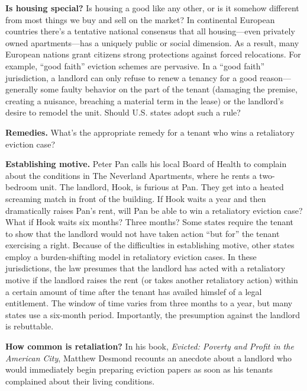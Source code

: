 \item \textbf{Is housing special?} Is housing a good like any other, or is it
somehow different from most things we buy and sell on the market? In
continental European countries there's a tentative national consensus that all
housing---even privately owned apartments---has a uniquely public or social
dimension.  As a result, many European nations grant citizens strong
protections against forced relocations.  For example, ``good faith'' eviction
schemes are pervasive.  In a ``good faith'' jurisdiction, a landlord can only
refuse to renew a tenancy for a good reason---generally some faulty behavior on
the part of the tenant (damaging the premise, creating a nuisance, breaching a
material term in the lease) or the landlord's desire to remodel the unit. 
Should U.S. states adopt such a rule?


\item \textbf{Remedies.} What's the appropriate remedy for a tenant who wins a
retaliatory eviction case?


\item \textbf{Establishing motive.} Peter Pan calls his local Board of Health to
complain about the conditions in The Neverland Apartments, where he rents a
two-bedroom unit. The landlord, Hook, is furious at Pan.  They get into a
heated screaming match in front of the building.  If Hook waits a year and then
dramatically raises Pan's rent, will Pan be able to win a retaliatory eviction
case?  What if Hook waits six months? Three months? Some states require the
tenant to show that the landlord would not have taken action ``but for'' the
tenant exercising a right.  Because of the difficulties in establishing motive,
other states employ a burden-shifting model in retaliatory eviction cases. In
these jurisdictions, the law presumes that the landlord has acted with a
retaliatory motive if the landlord raises the rent (or takes another
retaliatory action) within a certain amount of time after the tenant has
availed himslef of a legal entitlement. The window of time varies from three
months to a year, but many states use a six-month period.  Importantly, the
presumption against the landlord is rebuttable.


\item \textbf{How common is retaliation?} In his book, \textit{Evicted:
Poverty and Profit in the American City}, Matthew Desmond recounts an anecdote
about a landlord who would immediately begin preparing eviction papers as soon
as his tenants complained about their living conditions.

